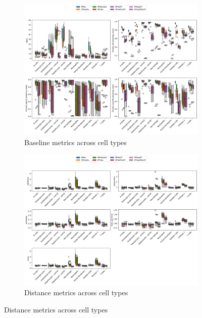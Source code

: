 \documentclass[12pt, a4paper]{article}
\begin{document}
\begin{figure}[h!]
    \centering
    \begin{subfigure}[t]{0.48\textwidth}
        \centering
        \includegraphics[width=\textwidth]{multi_task_benchmarking_cell_type_baseline_metrics_nault.png}
        \caption{Baseline metrics across cell types}
        \label{}
    \end{subfigure}
    \hfill
    \begin{subfigure}[t]{0.48\textwidth}
        \centering
        \includegraphics[width=\textwidth]{multi_task_benchmarking_cell_type_distance_metrics_nault.png}
        \caption{Distance metrics across cell types}
        \label{}
    \end{subfigure}

\end{figure}
\end{document}
